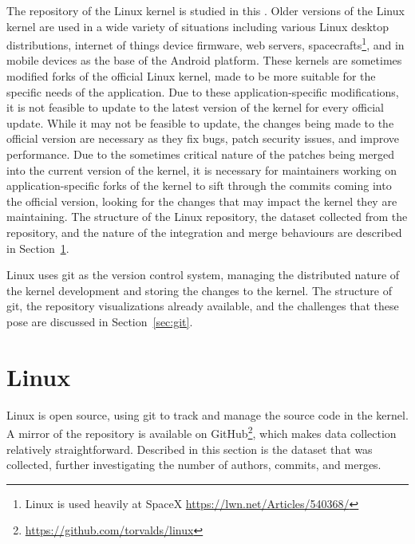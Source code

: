 The repository of the Linux kernel is studied in this \paper{}. Older
versions of the Linux kernel are used in a wide variety of situations
including various Linux desktop distributions, internet of things device
firmware, web servers, spacecrafts\footnote{Linux is used heavily at
  SpaceX \url{https://lwn.net/Articles/540368/}}, and in mobile devices
as the base of the Android platform. These kernels are sometimes
modified forks of the official Linux kernel, made to be more suitable
for the specific needs of the application. Due to these
application-specific modifications, it is not feasible to update to the
latest version of the kernel for every official update. While it may not
be feasible to update, the changes being made to the official version
are necessary as they fix bugs, patch security issues, and improve
performance. Due to the sometimes critical nature of the patches being
merged into the current version of the kernel, it is necessary for
maintainers working on application-specific forks of the kernel to sift
through the commits coming into the official version, looking for the
changes that may impact the kernel they are maintaining. The structure
of the Linux repository, the dataset collected from the repository, and
the nature of the integration and merge behaviours are described in
Section~\ref{sec:linux}.

Linux uses git as the version control system, managing the distributed
nature of the kernel development and storing the changes to the kernel.
The structure of git, the repository visualizations already available,
and the challenges that these pose are discussed in
Section~\ref{sec:git}.

\section{Linux}\label{sec:linux}

Linux is open source, using git to track and manage the source code in
the kernel. A mirror of the repository is available on
GitHub\footnote{\url{https://github.com/torvalds/linux}}, which makes
data collection relatively straightforward. Described in this section is
the dataset that was collected, further investigating the number of
authors, commits, and merges.

